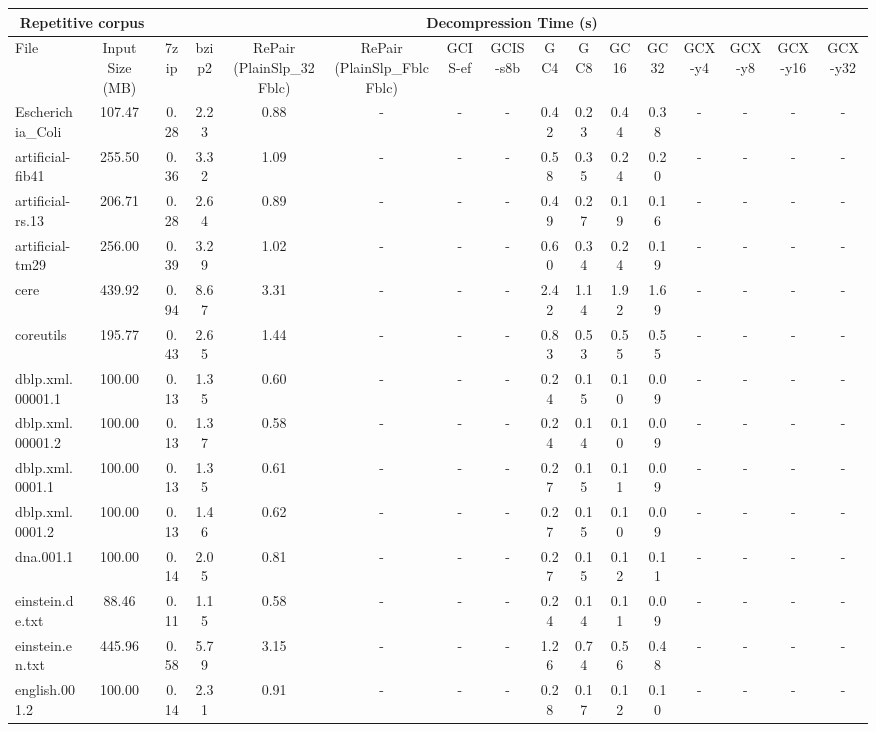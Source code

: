 \begin{table}[]
\centering
\begin{tabular}{|l|c|c|c|c|c|c|c|c|c|c|c|c|c|c|c|}
\hline
\multicolumn{2}{|c|}{Repetitive corpus} & \multicolumn{14}{c|}{Decompression Time (s)} \\
\hline
File & Input Size (MB) & 7zip & bzip2 & RePair (PlainSlp\_32Fblc) & RePair (PlainSlp\_FblcFblc) & GCIS-ef & GCIS-s8b & GC4 & GC8 & GC16 & GC32 & GCX-y4 & GCX-y8 & GCX-y16 & GCX-y32 \\
\hline
Escherichia\_Coli & 107.47 & 0.28 & 2.23 & 0.88 & - & - & - & 0.42 & 0.23 & 0.44 & 0.38 & - & - & - & - \\
\hline
artificial-fib41 & 255.50 & 0.36 & 3.32 & 1.09 & - & - & - & 0.58 & 0.35 & 0.24 & 0.20 & - & - & - & - \\
\hline
artificial-rs.13 & 206.71 & 0.28 & 2.64 & 0.89 & - & - & - & 0.49 & 0.27 & 0.19 & 0.16 & - & - & - & - \\
\hline
artificial-tm29 & 256.00 & 0.39 & 3.29 & 1.02 & - & - & - & 0.60 & 0.34 & 0.24 & 0.19 & - & - & - & - \\
\hline
cere & 439.92 & 0.94 & 8.67 & 3.31 & - & - & - & 2.42 & 1.14 & 1.92 & 1.69 & - & - & - & - \\
\hline
coreutils & 195.77 & 0.43 & 2.65 & 1.44 & - & - & - & 0.83 & 0.53 & 0.55 & 0.55 & - & - & - & - \\
\hline
dblp.xml.00001.1 & 100.00 & 0.13 & 1.35 & 0.60 & - & - & - & 0.24 & 0.15 & 0.10 & 0.09 & - & - & - & - \\
\hline
dblp.xml.00001.2 & 100.00 & 0.13 & 1.37 & 0.58 & - & - & - & 0.24 & 0.14 & 0.10 & 0.09 & - & - & - & - \\
\hline
dblp.xml.0001.1 & 100.00 & 0.13 & 1.35 & 0.61 & - & - & - & 0.27 & 0.15 & 0.11 & 0.09 & - & - & - & - \\
\hline
dblp.xml.0001.2 & 100.00 & 0.13 & 1.46 & 0.62 & - & - & - & 0.27 & 0.15 & 0.10 & 0.09 & - & - & - & - \\
\hline
dna.001.1 & 100.00 & 0.14 & 2.05 & 0.81 & - & - & - & 0.27 & 0.15 & 0.12 & 0.11 & - & - & - & - \\
\hline
einstein.de.txt & 88.46 & 0.11 & 1.15 & 0.58 & - & - & - & 0.24 & 0.14 & 0.11 & 0.09 & - & - & - & - \\
\hline
einstein.en.txt & 445.96 & 0.58 & 5.79 & 3.15 & - & - & - & 1.26 & 0.74 & 0.56 & 0.48 & - & - & - & - \\
\hline
english.001.2 & 100.00 & 0.14 & 2.31 & 0.91 & - & - & - & 0.28 & 0.17 & 0.12 & 0.10 & - & - & - & - \\

\end{tabular}
\end{table}
